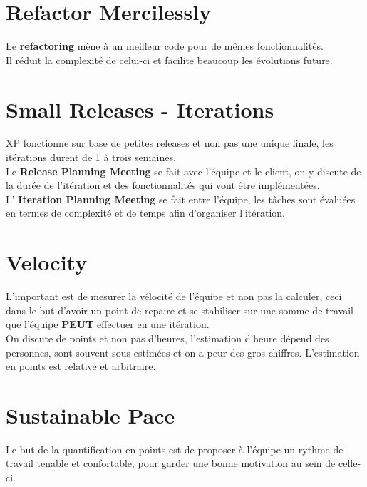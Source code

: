 \documentclass{report}
\begin{document}
	\section{Refactor Mercilessly}

		Le \textbf{refactoring} mène à un meilleur code pour de mêmes fonctionnalités.\\

		Il réduit la complexité de celui-ci et facilite beaucoup les évolutions future.\\

	\section{Small Releases - Iterations}

		XP fonctionne sur base de petites releases et non pas une unique finale, les itérations durent de 1 à trois semaines.\\

		Le \textbf{Release Planning Meeting} se fait avec l'équipe et le client, on y discute de la durée de l'itération et des fonctionnalités qui vont être implémentées.\\

		L' \textbf{Iteration Planning Meeting} se fait entre l'équipe, les tâches sont évaluées en termes de complexité et de temps afin d'organiser l'itération.\\

	\section{Velocity}

		L'important est de mesurer la vélocité de l'équipe et non pas la calculer, ceci dans le but d'avoir un point de repaire et se stabiliser sur une somme de travail que l'équipe \textbf{PEUT} effectuer en une itération.\\

		On discute de points et non pas d'heures, l'estimation d'heure dépend des personnes, sont souvent sous-estimées et on a peur des gros chiffres. L'estimation en points est relative et arbitraire.\\

	\section{Sustainable Pace}

		Le but de la quantification en points est de proposer à l'équipe un rythme de travail tenable et confortable, pour garder une bonne motivation au sein de celle-ci.\\
\end{document}
